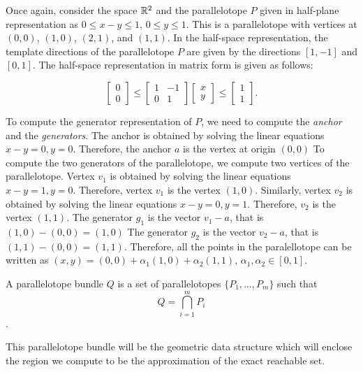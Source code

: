 \begin{example}
\label{ex:ptope}
Once again, consider the space ${\mathbb{R}}^2$ and the parallelotope $P$ given in half-plane representation as $0 \leq x-y \leq 1$, $0 \leq y \leq 1$.
%
This is a parallelotope with vertices at $(0,0)$, $(1,0)$, $(2,1)$, and $(1,1)$.
%
In the half-space representation, the template directions of the parallelotope $P$ are given by the directions $[1, -1]$ and $[0, 1]$.
%
The half-space representation in matrix form is given as follows:

\begin{equation}
  \begin{bmatrix} 0 \\ 0 \end{bmatrix} \leq \begin{bmatrix}  1 & -1 \\ 0 &  1 \end{bmatrix}  \begin{bmatrix} x \\ y \end{bmatrix} \leq \begin{bmatrix} 1 \\ 1 \end{bmatrix}. \label{eq:ptopeexample}
\end{equation}

To compute the generator representation of $P$, we need to compute the \emph{anchor} and the \emph{generators}.
%
The anchor is obtained by solving the linear equations $x-y = 0, y = 0$.
%
Therefore, the anchor $a$ is the vertex at origin $(0,0)$
%
To compute the two generators of the parallelotope, we compute two vertices of the parallelotope.
%
Vertex $v_1$ is obtained by solving the linear equations $x - y = 1, y = 0$.
%
Therefore, vertex $v_1$ is the vertex $(1,0)$.
%
Similarly, vertex $v_2$ is obtained by solving the linear equations $x-y = 0, y = 1$.
%
Therefore, $v_2$ is the vertex $(1,1)$.
%
The generator $g_1$ is the vector $v_1 - a$, that is $(1,0)- (0,0) = (1,0)$
%
The generator $g_2$ is the vector $v_2 - a$, that is $(1,1) - (0,0) = (1,1)$.
%
Therefore, all the points in the paralellotope can be written as $(x,y) = (0,0) + \alpha_1 (1,0) + \alpha_2(1,1)$, $\alpha_1, \alpha_2 \in [0,1]$.
\end{example}
%
%
\begin{definition}
A parallelotope bundle $Q$ is a set of parallelotopes $\{P_1, \ldots, P_m\}$ such that
  $$ Q = \bigcap_{i=1}^{m}P_i $$.
\end{definition}
%
\noindent This parallelotope bundle will be the geometric data structure which will enclose the region we compute to be the approximation of the exact reachable set.

